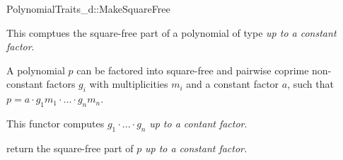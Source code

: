 \begin{ccRefConcept}{PolynomialTraits_d::MakeSquareFree}
\ccDefinition

This  comptues the square-free part of 
a polynomial of type   
{\em up to a constant factor}.  

A polynomial $p$ can be  factored into square-free and pairwise coprime 
non-constant factors $g_i$ with multiplicities $m_i$ and a constant factor $a$, 
such that $p = a  \cdot  g_1m_1  \cdot  ...  \cdot  g_nm_n$.


This functor computes  $g_1  \cdot  ...  \cdot  g_n$ {\em up to a contant factor}. 

\ccRefines 
{}

\ccTypes

\ccGlue
{}

\ccOperations
{}
         { return the square-free part of $p$ {\em up to a constant factor.} }



\ccSeeAlso

\\
\end{ccRefConcept}
